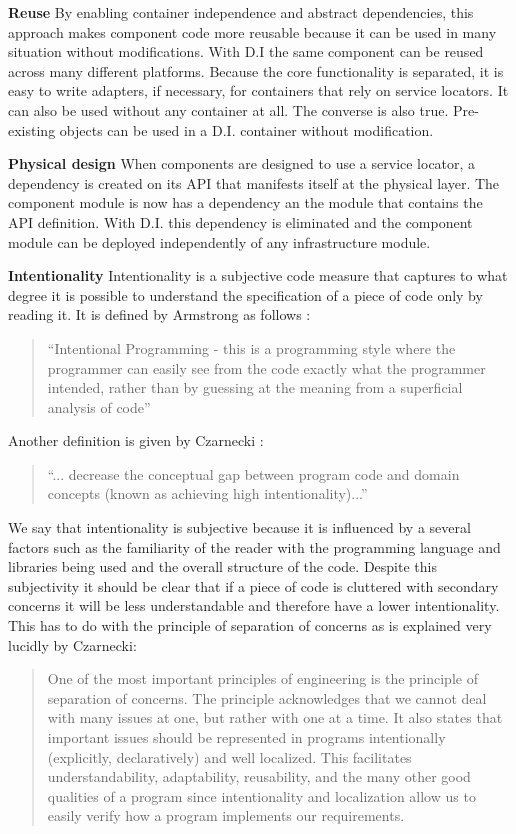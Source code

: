 \textbf{Reuse} By enabling container independence and abstract dependencies, this approach makes component
code more reusable because it can be used in many situation without modifications. With D.I the same
component can be reused across many different platforms. Because the core functionality is separated, it
is easy to write adapters, if necessary, for containers that rely on service locators. It can also be
used without any container at all. The converse is also true. Pre-existing objects can be used in a
D.I. container without modification.

\textbf{Physical design} When components are designed to use a service locator, a dependency is created on its API
that manifests itself at the physical layer. The component module is now has a dependency an the module that
contains the API definition.  With D.I. this dependency is eliminated and the component module can be
deployed independently of any infrastructure module.

\textbf{Intentionality} Intentionality is a subjective code measure that captures to what degree it is possible to
understand the specification of a piece of code only by reading it. It is defined by Armstrong as follows \cite{Armstrong}:

\begin{quotation}
``Intentional Programming - this is a programming style where the programmer can easily see from the code exactly
what the programmer intended, rather than by guessing at the meaning from a superficial analysis of code''
\end{quotation}

Another definition is given by Czarnecki \cite{Czarnecki98}:

\begin{quotation}
``... decrease the conceptual gap between program code and domain concepts (known as achieving high intentionality)...''
\end{quotation}

We say that intentionality is subjective because it is influenced by a several factors such as the familiarity of
the reader with the programming language and libraries being used and the overall structure of the code. Despite
this subjectivity it should be clear that if a piece of code is cluttered with secondary concerns it will be
less understandable and therefore have a lower intentionality. This has to do with the principle of separation of
concerns as is explained very lucidly by Czarnecki:

\begin{quotation}
One of the most important principles of engineering is the principle of separation of concerns.
The principle acknowledges that we cannot deal with many issues at one, but rather with one at a
time. It also states that important issues should be represented in programs intentionally (explicitly, declaratively)
and well localized. This facilitates understandability, adaptability, reusability, and the many other good qualities 
of a program since intentionality and localization allow us to easily verify how a program implements our requirements.
\end{quotation}

